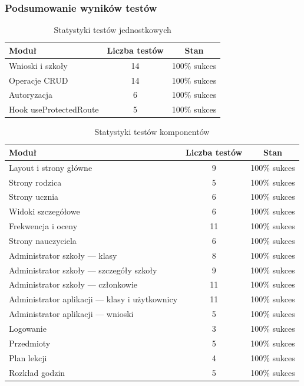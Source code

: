 \documentclass[12pt,a4paper]{article}
\begin{document}
\subsubsection{Podsumowanie wyników testów}
\begin{table}[H]
    \centering
    \begin{tabular}{|l|c|c|}
        \hline
        \textbf{Moduł} & \textbf{Liczba testów} & \textbf{Stan} \\ \hline
        Wnioski i szkoły & 14 & 100\% sukces \\ \hline
        Operacje CRUD & 14 & 100\% sukces \\ \hline
        Autoryzacja & 6 & 100\% sukces \\ \hline
        Hook useProtectedRoute & 5 & 100\% sukces \\ \hline
    \end{tabular}
    \caption{Statystyki testów jednostkowych}
\end{table}

\begin{table}[H]
    \centering
    \begin{tabular}{|l|c|c|}
        \hline
        \textbf{Moduł} & \textbf{Liczba testów} & \textbf{Stan} \\ \hline
        Layout i strony główne & 9 & 100\% sukces \\ \hline
        Strony rodzica & 5 & 100\% sukces \\ \hline
        Strony ucznia & 6 & 100\% sukces \\ \hline
        Widoki szczegółowe & 6 & 100\% sukces \\ \hline
        Frekwencja i oceny & 11 & 100\% sukces \\ \hline
        Strony nauczyciela & 6 & 100\% sukces \\ \hline
        Administrator szkoły — klasy & 8 & 100\% sukces \\ \hline
        Administrator szkoły — szczegóły szkoły & 9 & 100\% sukces \\ \hline
        Administrator szkoły — członkowie & 11 & 100\% sukces \\ \hline
        Administrator aplikacji — klasy i użytkownicy & 11 & 100\% sukces \\ \hline
        Administrator aplikacji — wnioski & 5 & 100\% sukces \\ \hline
        Logowanie & 3 & 100\% sukces \\ \hline
        Przedmioty & 5 & 100\% sukces \\ \hline
        Plan lekcji & 4 & 100\% sukces \\ \hline
        Rozkład godzin & 5 & 100\% sukces \\ \hline
    \end{tabular}
    \caption{Statystyki testów komponentów}
\end{table}
\end{document}
